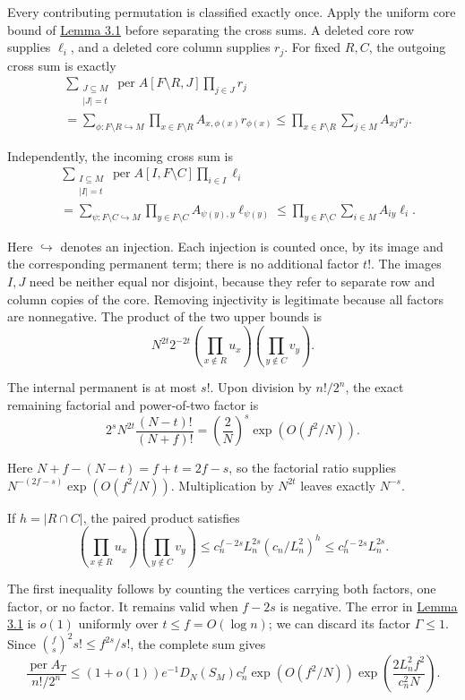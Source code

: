 \documentclass[11pt,a4paper]{article}
\newcommand{\paperref}[2]{\hyperref[#1]{#2}}
\begin{document}
Every contributing permutation is classified exactly once. Apply the uniform core bound of \paperref{thm-3.1}{Lemma 3.1} before separating the cross sums. A deleted core row supplies \(\ell_i\), and a deleted core column supplies \(r_j\). For fixed \(R,C\), the outgoing cross sum is exactly
\[\begin{aligned}
&\sum_{\substack{J\subseteq M\\|J|=t}}
\operatorname{per}A[F\setminus R,J]\prod_{j\in J}r_j\\
&=\sum_{\phi:F\setminus R\hookrightarrow M}
\prod_{x\in F\setminus R}A_{x,\phi(x)}r_{\phi(x)}
\le\prod_{x\in F\setminus R}\sum_{j\in M}A_{xj}r_j.
\end{aligned}\]

Independently, the incoming cross sum is
\[\begin{aligned}
&\sum_{\substack{I\subseteq M\\|I|=t}}
\operatorname{per}A[I,F\setminus C]\prod_{i\in I}\ell_i\\
&=\sum_{\psi:F\setminus C\hookrightarrow M}
\prod_{y\in F\setminus C}A_{\psi(y),y}\ell_{\psi(y)}
\le\prod_{y\in F\setminus C}\sum_{i\in M}A_{iy}\ell_i.
\end{aligned}\]

Here \(\hookrightarrow\) denotes an injection. Each injection is counted once, by its image and the corresponding permanent term; there is no additional factor \(t!\). The images \(I,J\) need be neither equal nor disjoint, because they refer to separate row and column copies of the core. Removing injectivity is legitimate because all factors are nonnegative. The product of the two upper bounds is
\[N^{2t}2^{-2t}
\left(\prod_{x\notin R}u_x\right)
\left(\prod_{y\notin C}v_y\right).\]

The internal permanent is at most \(s!\). Upon division by \(n!/2^n\), the exact remaining factorial and power-of-two factor is
\[2^sN^{2t}\frac{(N-t)!}{(N+f)!}
=\left(\frac2N\right)^s\exp(O(f^2/N)).\]

Here \(N+f-(N-t)=f+t=2f-s\), so the factorial ratio supplies \(N^{-(2f-s)}\exp(O(f^2/N))\). Multiplication by \(N^{2t}\) leaves exactly \(N^{-s}\).

If \(h=|R\cap C|\), the paired product satisfies
\[\left(\prod_{x\notin R}u_x\right)
\left(\prod_{y\notin C}v_y\right)
\le c_n^{f-2s}L_n^{2s}(c_n/L_n^2)^h
\le c_n^{f-2s}L_n^{2s}.\]

The first inequality follows by counting the vertices carrying both factors, one factor, or no factor. It remains valid when \(f-2s\) is negative. The error in \paperref{thm-3.1}{Lemma 3.1} is \(o(1)\) uniformly over \(t\le f=O(\log n)\); we can discard its factor \(\Gamma\le1\). Since \(\binom fs^2s!\le f^{2s}/s!\), the complete sum gives
\[\frac{\operatorname{per}A_T}{n!/2^n}
\le(1+o(1))e^{-1}D_N(S_M)c_n^f
\exp(O(f^2/N))
\exp\left(\frac{2L_n^2f^2}{c_n^2N}\right).\]
\end{document}
